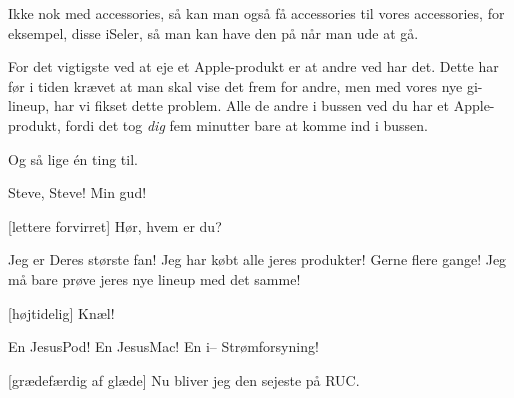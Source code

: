 \documentclass[a4paper,11pt]{article}
\begin{document}
\begin{sketch}

  Ikke nok med accessories, så kan man også få accessories til vores 
accessories, for eksempel, disse iSeler, så man kan have den på når man ude at gå.

  For det vigtigste ved at eje et Apple-produkt er at andre ved har det.
Dette har før i tiden krævet at man skal vise det frem for andre, men med vores 
nye gi-lineup, har vi fikset dette problem.  Alle de andre i bussen ved du har et Apple-
produkt, fordi det tog \emph{dig} fem minutter bare at komme ind i bussen.

 Og så lige én ting til.


  Steve, Steve!  Min gud!

[lettere forvirret] Hør, hvem er du?

  Jeg er Deres største fan!  Jeg har købt alle jeres produkter!  Gerne
flere gange!  Jeg må bare prøve jeres nye lineup med det samme!

[højtidelig] Knæl!


   En JesusPod!   En JesusMac!
 En i--  Strømforsyning!


[grædefærdig af glæde] Nu bliver jeg den sejeste på RUC. 


\end{sketch}
\end{document}
